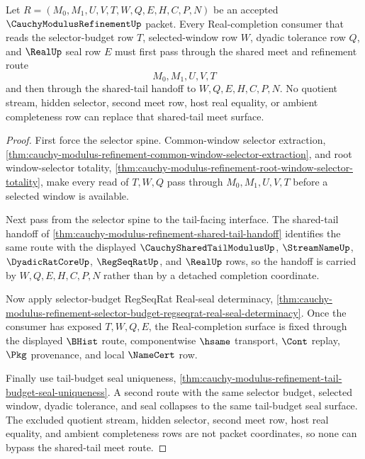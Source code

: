 \begin{theorem}
\label{thm:cauchy-modulus-refinement-selector-budget-tail-meet-nonescape}
Let $R=(M_0,M_1,U,V,T,W,Q,E,H,C,P,N)$ be an accepted $\CauchyModulusRefinementUp$ packet. Every Real-completion consumer that reads the selector-budget row $T$, selected-window row $W$, dyadic tolerance row $Q$, and $\RealUp$ seal row $E$ must first pass through the shared meet and refinement route
$$
M_0,M_1,U,V,T
$$
and then through the shared-tail handoff to $W,Q,E,H,C,P,N$. No quotient stream, hidden selector, second meet row, host real equality, or ambient completeness row can replace that shared-tail meet surface.
\end{theorem}
\begin{proof}
First force the selector spine. Common-window selector extraction, \autoref{thm:cauchy-modulus-refinement-common-window-selector-extraction}, and root window-selector totality, \autoref{thm:cauchy-modulus-refinement-root-window-selector-totality}, make every read of $T,W,Q$ pass through $M_0,M_1,U,V,T$ before a selected window is available.

Next pass from the selector spine to the tail-facing interface. The shared-tail handoff of \autoref{thm:cauchy-modulus-refinement-shared-tail-handoff} identifies the same route with the displayed $\CauchySharedTailModulusUp$, $\StreamNameUp$, $\DyadicRatCoreUp$, $\RegSeqRatUp$, and $\RealUp$ rows, so the handoff is carried by $W,Q,E,H,C,P,N$ rather than by a detached completion coordinate.

Now apply selector-budget RegSeqRat Real-seal determinacy, \autoref{thm:cauchy-modulus-refinement-selector-budget-regseqrat-real-seal-determinacy}. Once the consumer has exposed $T,W,Q,E$, the Real-completion surface is fixed through the displayed $\BHist$ route, componentwise $\hsame$ transport, $\Cont$ replay, $\Pkg$ provenance, and local $\NameCert$ row.

Finally use tail-budget seal uniqueness, \autoref{thm:cauchy-modulus-refinement-tail-budget-seal-uniqueness}. A second route with the same selector budget, selected window, dyadic tolerance, and seal collapses to the same tail-budget seal surface. The excluded quotient stream, hidden selector, second meet row, host real equality, and ambient completeness rows are not packet coordinates, so none can bypass the shared-tail meet route.
\end{proof}

